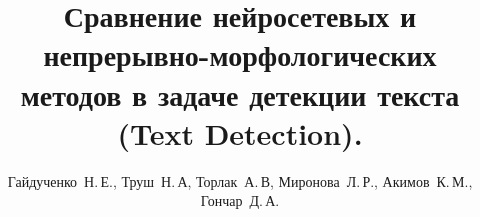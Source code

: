 \documentclass[12pt,twoside]{article}
\title
    [Обнаружение текста]
    {\textbf{Сравнение нейросетевых и непрерывно-морфологических методов в задаче детекции текста (Text Detection).}}
\author
    {Гайдученко~Н.\,Е., Труш~Н.\,А, Торлак~А.\,В, Миронова~Л.\,Р., Акимов~К.\,М., Гончар~Д.\,А.}
\begin{document}
\maketitle
\bigskip
\bigskip
\bigskip
\bigskip
\bigskip
\maketitleSecondary
\end{document}
